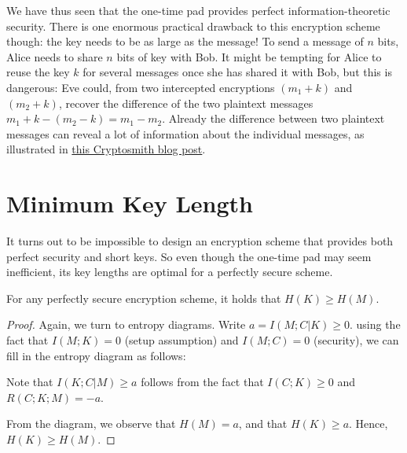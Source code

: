 We have thus seen that the one-time pad provides perfect information-theoretic security. There is one enormous practical drawback to this encryption scheme though: the key needs to be as large as the message! To send a message of $n$ bits, Alice needs to share $n$ bits of key with Bob. It might be tempting for Alice to reuse the key $k$ for several messages once she has shared it with Bob, but this is dangerous: Eve could, from two intercepted encryptions $(m_1 + k)$ and $(m_2 + k)$, recover the difference of the two plaintext messages $m_1 + k - (m_2 - k) = m_1 - m_2$. Already the difference between two plaintext messages can reveal a lot of information about the individual messages, as illustrated in \href{https://cryptosmith.com/2008/05/31/stream-reuse/}{this Cryptosmith blog post}.

\section{Minimum Key Length}
It turns out to be impossible to design an encryption scheme that provides both perfect security and short keys. So even though the one-time pad may seem inefficient, its key lengths are optimal for a perfectly secure scheme.
\begin{theorem} 
For any perfectly secure encryption scheme, it holds that $H(K) \geq H(M)$.
\end{theorem}
\begin{proof}
Again, we turn to entropy diagrams. Write $a = I(M;C|K) \geq 0$. using the fact that $I(M;K) = 0$ (setup assumption) and $I(M;C) = 0$ (security), we can fill in the entropy diagram as follows:

\begin{center}
\end{center}
Note that $I(K;C|M) \geq a$ follows from the fact that $I(C;K) \geq 0$ and $R(C;K;M) = -a$.

From the diagram, we observe that $H(M) = a$, and that $H(K) \geq a$. Hence, $H(K) \geq H(M)$.
\end{proof}

